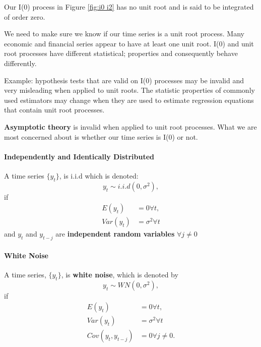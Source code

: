 \documentclass[11pt]{article}
\begin{document}
Our I(0) process in Figure \ref{fig:i0 i2} has no unit root and is said to be integrated of order zero.

We need to make sure we know if our time series is a unit root process. Many economic and financial series appear to have at least one unit root. I(0) and unit root processes have different statistical; properties and consequently behave differently.

Example: hypothesis tests that are valid on I(0) processes may be invalid and very misleading when applied to unit roots. The statistic properties of commonly used estimators may change when they are used to estimate regression equations that contain unit root processes.

\textbf{Asymptotic theory} is invalid when applied to unit root processes. What we are most concerned about is whether our time series is I(0) or not.

\begin{mdframed}
    \paragraph{Independently and Identically Distributed} \mbox{}

    A time series $\{y_t\}$, is i.i.d which is denoted:
    \[y_t \sim i.i.d(0,\sigma^2),\]
    if
    \begin{align*}
        E(y_t) &= 0 \forall t, \\
        Var(y_t) &= \sigma^2 \forall t
    \end{align*}
    and $y_t$ and $y_{t-j}$ are \textbf{independent random variables} $\forall j \neq0$
\end{mdframed}


\begin{mdframed}
    \paragraph{White Noise} \mbox{}

    A time series, $\{y_t\}$, is \textbf{white noise}, which is denoted by
    \[y_t \sim WN(0,\sigma^2),\]
    if
    \begin{align*}
        E(y_t) &= 0 \forall t, \\
        Var(y_t) &= \sigma^2 \forall t \\
        Cov(y_t, y_{t-j}) &= 0 \forall j \neq 0. 
    \end{align*}
\end{mdframed}
\end{document}
